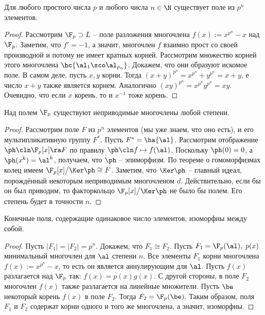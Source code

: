 \documentclass[a4paper]{article}
\begin{document}
\begin{theorem}
Для любого простого числа $p$ и любого числа $n \in \N$ существует поле из $p^n$ элементов.
\end{theorem}
\begin{proof}
Рассмотрим $\F_p \supset L$ -- поле разложения многочлена $f(x):=x^{p^n}-x$ над $\F_p$. Заметим,  что
$f'=-1$, а значит, многочлен $f$ взаимно прост со своей производной и потому не имеет кратных корней.
Рассмотрим множество корней этого многочлена $\hc{\al_1 \sco \al_{p_n}}$. Докажем, что они образуют
искомое поле. В самом деле, пусть $x, y$ корни. Тогда $(x+y)^{p^n}=x^{p^n}+y^{p^n}=x+y$, е число
$x+y$ также является корнем. Аналогично $(xy)^{p^n}=x^{p^n}y^{p^n}=xy$. Очевидно, что если $x$ корень, то
и $x^{-1}$ тоже корень.
\end{proof}

\begin{lemma}
Над полем $\F_p$ существуют неприводимые многочлены любой степени.
\end{lemma}
\begin{proof}
Рассмотрим поле $F$ из $p^n$ элементов (мы уже знаем, что оно есть), и его мультипликативную группу $F^*$.
Пусть $F^* = \ha{\al}$. Рассмотрим отображение $\ph\cln \F_p[x] \ra F$ по правилу $\ph\cln f \mapsto f(\al)$.
Поскольку $\ph(0) = 0$, а $\ph(x^k) = \al^k$, получаем, что $\ph$ -- эпиморфизм. По теореме о
гомоморфизмах колец имеем $\F_p[x]\bigr/\Ker \ph \cong F$. Заметим, что $\Ker \ph$ -- главный идеал,
порождённый некоторым неприводимым многочленом $d$. Действительно, если бы он был приводим, то факторкольцо
$\F_p[x]\bigr/\Ker \ph$ не было бы полем. Его степень будет в точности $n$.
\end{proof}

\begin{theorem}
Конечные поля, содержащие одинаковое число элементов, изоморфны между собой.
\end{theorem}
\begin{proof}
Пусть $|F_1|=|F_2| = p^n$. Докажем, что $F_1 \cong F_2$. Пусть $F_1=\F_p(\al), \; p(x)$ минимальный
многочлен для $\al$ степени $n$. Все элементы $F_1$ корни многочлена $f(x):=x^{p^n}-x$, то есть он
является аннулирующим для $\al$. Пусть $f(x)$ разлагается над $\F_p$ так: $f(x)=p(x)g(x)$. С другой
стороны, в поле $F_2$ многочлен $f(x)$ также разлагается на линейные множители. Пусть $\be$ некоторый
корень $f(x)$ в поле $F_2$. Тогда $F_2=\F_p(\be)$. Таким образом, поля $F_1$ и $F_2$ содержат корни одного
и того же многочлена, а значит, изоморфны.
\end{proof}
\end{document}
